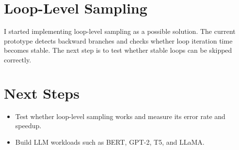 \documentclass[11pt]{article}
\begin{document}
\section{Loop-Level Sampling}

I started implementing loop-level sampling as a possible solution. The current
prototype detects backward branches and checks whether loop iteration time
becomes stable. The next step is to test whether stable loops can be skipped
correctly.

\section{Next Steps}

\begin{itemize}
  \item Test whether loop-level sampling works and measure its error rate and speedup.
  \item Build LLM workloads such as BERT, GPT-2, T5, and LLaMA.
\end{itemize}
\end{document}
